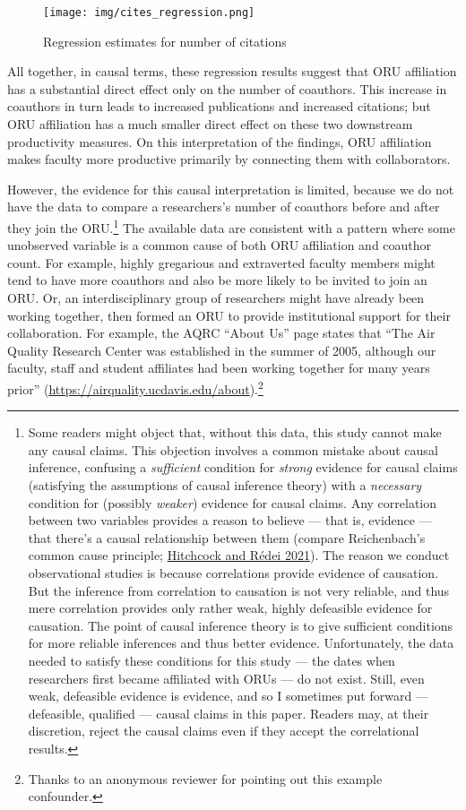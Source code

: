 \documentclass[
  11pt,
]{article}
\begin{document}
\begin{figure}
\centering
\texttt{[image: img/cites\_regression.png]}
\caption{Regression estimates for number of citations \label{fig.reg.cites}}
\end{figure}

All together, in causal terms, these regression results suggest that ORU affiliation has a substantial direct effect only on the number of coauthors. This increase in coauthors in turn leads to increased publications and increased citations; but ORU affiliation has a much smaller direct effect on these two downstream productivity measures. On this interpretation of the findings, ORU affiliation makes faculty more productive primarily by connecting them with collaborators.

However, the evidence for this causal interpretation is limited, because we do not have the data to compare a researchers's number of coauthors before and after they join the ORU.\footnote{Some readers might object that, without this data, this study cannot make any causal claims. This objection involves a common mistake about causal inference, confusing a \emph{sufficient} condition for \emph{strong} evidence for causal claims (satisfying the assumptions of causal inference theory) with a \emph{necessary} condition for (possibly \emph{weaker}) evidence for causal claims. Any correlation between two variables provides a reason to believe --- that is, evidence --- that there's a causal relationship between them (compare Reichenbach's common cause principle; \protect\hyperlink{ref-HitchcockReichenbachCommonCause2021}{Hitchcock and Rédei 2021}). The reason we conduct observational studies is because correlations provide evidence of causation. But the inference from correlation to causation is not very reliable, and thus mere correlation provides only rather weak, highly defeasible evidence for causation. The point of causal inference theory is to give sufficient conditions for more reliable inferences and thus better evidence. Unfortunately, the data needed to satisfy these conditions for this study --- the dates when researchers first became affiliated with ORUs --- do not exist. Still, even weak, defeasible evidence is evidence, and so I sometimes put forward --- defeasible, qualified --- causal claims in this paper. Readers may, at their discretion, reject the causal claims even if they accept the correlational results.} The available data are consistent with a pattern where some unobserved variable is a common cause of both ORU affiliation and coauthor count. For example, highly gregarious and extraverted faculty members might tend to have more coauthors and also be more likely to be invited to join an ORU. Or, an interdisciplinary group of researchers might have already been working together, then formed an ORU to provide institutional support for their collaboration. For example, the AQRC ``About Us'' page states that ``The Air Quality Research Center was established in the summer of 2005, although our faculty, staff and student affiliates had been working together for many years prior'' (\url{https://airquality.ucdavis.edu/about}).\footnote{Thanks to an anonymous reviewer for pointing out this example confounder.}
\end{document}
